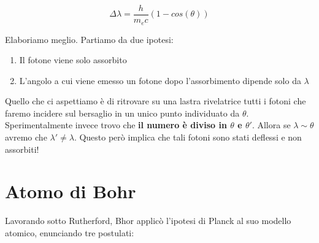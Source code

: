 \begin{equation}
\Delta \lambda = \frac{h}{m_e c}(1 - cos(\theta))
\end{equation}

Elaboriamo meglio. Partiamo da due ipotesi:

\begin{enumerate}
	\item Il fotone viene solo assorbito
	\item L'angolo a cui viene emesso un fotone dopo l'assorbimento dipende solo da $\lambda$
\end{enumerate}

Quello che ci aspettiamo \`e di ritrovare su una lastra rivelatrice tutti i fotoni che faremo incidere sul bersaglio in un unico punto individuato da $\theta$.\newline
Sperimentalmente invece trovo che \textbf{il numero è diviso in $\theta$ e $\theta'$}. Allora se $\lambda \sim \theta$ avremo che $\lambda' \ne \lambda$. Questo però implica che tali fotoni sono stati deflessi e non assorbiti! 

 \begin{figure}[!htb]
\end{figure}

\section{Atomo di Bohr}

Lavorando sotto Rutherford, Bhor applicò l'ipotesi di Planck al suo modello atomico, enunciando tre postulati:

